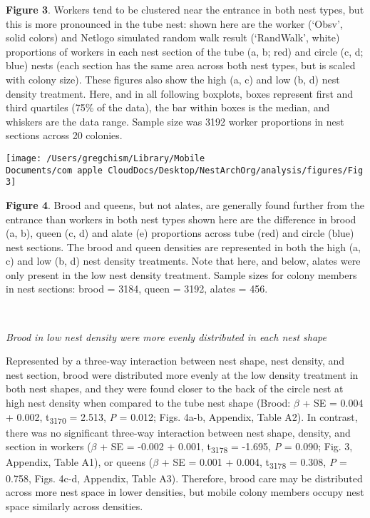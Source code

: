 \documentclass[3p]{elsarticle} %
\begin{document}
\textbf{Figure 3}. Workers tend to be clustered near the entrance in
both nest types, but this is more pronounced in the tube nest: shown
here are the worker (`Obsv', solid colors) and Netlogo simulated random
walk result (`RandWalk', white) proportions of workers in each nest
section of the tube (a, b; red) and circle (c, d; blue) nests (each
section has the same area across both nest types, but is scaled with
colony size). These figures also show the high (a, c) and low (b, d)
nest density treatment. Here, and in all following boxplots, boxes
represent first and third quartiles (75\% of the data), the bar within
boxes is the median, and whiskers are the data range. Sample size was
3192 worker proportions in nest sections across 20 colonies.

\begin{flushleft}\texttt{[image: /Users/gregchism/Library/Mobile Documents/com~apple~CloudDocs/Desktop/NestArchOrg/analysis/figures/Fig3]} \end{flushleft}

\textbf{Figure 4}. Brood and queens, but not alates, are generally found
further from the entrance than workers in both nest types shown here are
the difference in brood (a, b), queen (c, d) and alate (e) proportions
across tube (red) and circle (blue) nest sections. The brood and queen
densities are represented in both the high (a, c) and low (b, d) nest
density treatments. Note that here, and below, alates were only present
in the low nest density treatment. Sample sizes for colony members in
nest sections: brood = 3184, queen = 3192, alates = 456.

~

\emph{Brood in low nest density were more evenly distributed in each
nest shape}

Represented by a three-way interaction between nest shape, nest density,
and nest section, brood were distributed more evenly at the low density
treatment in both nest shapes, and they were found closer to the back of
the circle nest at high nest density when compared to the tube nest
shape (Brood: \(\beta\) + SE = 0.004 + 0.002, t\textsubscript{3170} =
2.513, \emph{P} = 0.012; Figs. 4a-b, Appendix, Table A2). In contrast,
there was no significant three-way interaction between nest shape,
density, and section in workers (\(\beta\) + SE = -0.002 + 0.001,
t\textsubscript{3178} = -1.695, \emph{P} = 0.090; Fig. 3, Appendix,
Table A1), or queens (\(\beta\) + SE = 0.001 + 0.004,
t\textsubscript{3178} = 0.308, \emph{P} = 0.758, Figs. 4c-d, Appendix,
Table A3). Therefore, brood care may be distributed across more nest
space in lower densities, but mobile colony members occupy nest space
similarly across densities.
\end{document}
